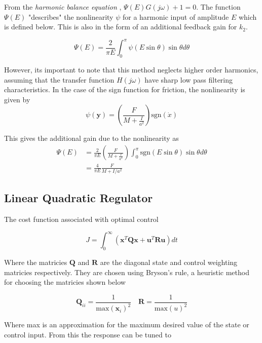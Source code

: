 \documentclass{article}
\begin{document}
From the \textit{harmonic balance equation} \cite{non_linear_systems}, $\Psi(E)G(j\omega) + 1 = 0$.
The function $\Psi(E)$ "describes" the nonlinearity $\psi$ for a harmonic input of amplitude $E$ which is defined below.
This is also in the form of an additional feedback gain for $k_2$.

\begin{equation}
  \Psi(E) = \frac{2}{\pi E} \int_0^{\pi} \psi(E\sin\theta)\sin\theta d\theta
\end{equation}

However, its important to note that this method neglects higher order harmonics, assuming that the transfer function $H(j\omega)$ have sharp low pass filtering characteristics.
In the case of the sign function for friction, the nonlinearity is given by 
\begin{equation}
  \psi(\mathbf{y}) = \left(\frac{F}{M + \frac{I}{a^2}} \right) \text{sgn}(\dot{x})
\end{equation}

This gives the additional gain due to the nonlinearity as
\begin{align}
  \Psi(E) &= \frac{2}{\pi E} \left(\frac{F}{M + \frac{I}{a^2}} \right) \int_0^{\pi} \text{sgn}(E\sin\theta)\sin\theta d\theta \\
          &= \frac{4}{\pi E} \frac{F}{M + I/{a^2}}
\end{align}


\subsection{Linear Quadratic Regulator}

The cost function associated with optimal control

\begin{equation}
  J = \int_0^\infty \left( \mathbf{x}^T \mathbf{Q} \mathbf{x} + \mathbf{u}^T \mathbf{R} \mathbf{u} \right) dt
\end{equation}

Where the matricies $\mathbf{Q}$ and $\mathbf{R}$ are the diagonal state and control weighting matricies respectively.
They are chosen using Bryson's rule, a heuristic method for choosing the matricies shown below 

\begin{equation}
  \mathbf{Q}_{ii} = \frac{1}{\text{max}(\mathbf{x}_i)^2} \quad \mathbf{R} = \frac{1}{\text{max}(u)^2}
\end{equation}

Where max is an approximation for the maximum desired value of the state or control input.
From this the response can be tuned to 
\end{document}
